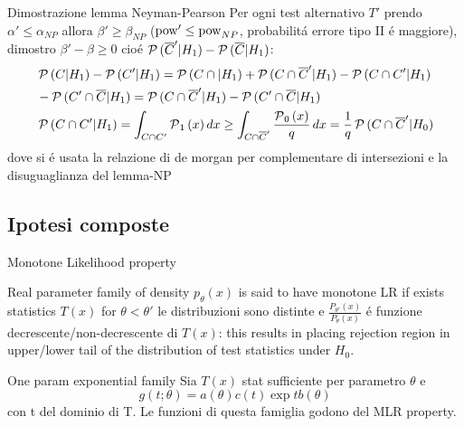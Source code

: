 \begin{wordonframe}{Dimostrazione lemma Neyman-Pearson}
Per ogni test alternativo $T'$ prendo $\alpha'\leq\alpha_{NP}$ allora $\beta'\geq\beta_{NP}$ ($\operatorname{pow}'\leq\operatorname{pow}_{NP}$, probabilit\'a errore tipo II \'e maggiore), dimostro $\beta'-\beta\geq0$ cio\'e $\operatorname{\mathcal{P}}{(\overline{C}'|H_1)}-\operatorname{\mathcal{P}}{(\overline{C}|H_1)}$:
\begin{align*}
&\operatorname{\mathcal{P}}{(C|H_1)}-\operatorname{\mathcal{P}}{(C'|H_1)}=\operatorname{\mathcal{P}}{(C\cap|H_1)}+\operatorname{\mathcal{P}}{(C\cap\overline{C}'|H_1)}-\operatorname{\mathcal{P}}{(C\cap C'|H_1)}\\
&-\operatorname{\mathcal{P}}{(C'\cap\overline{C}|H_1)}=\operatorname{\mathcal{P}}{(C\cap\overline{C}'|H_1)}-\operatorname{\mathcal{P}}{(C'\cap\overline{C}|H_1)}\\
&\operatorname{\mathcal{P}}{(C\cap C'|H_1)}=\int_{C\cap C'}\operatorname{\mathcal{P}}_1{(x)}\,dx\geq\int_{C\cap \overline{C}'}\frac{\operatorname{\mathcal{P}}_0{(x)}}{q}\,dx=\frac{1}{q}\operatorname{\mathcal{P}}{(C\cap\overline{C}'|H_0)}
\end{align*}
dove si \'e usata la relazione di de morgan per complementare di intersezioni e la disuguaglianza del lemma-NP
\end{wordonframe}

\subsection{Ipotesi composte}

\begin{frame}{Monotone Likelihood property}
\begin{block}{}
Real parameter family of density $p_{\theta}(x)$ is said to have monotone LR if exists statistics $T(x)$ for $\theta<\theta'$ le distribuzioni sono distinte e $\frac{P_{\theta'}(x)}{P_{\theta}(x)}$ \'e funzione decrescente/non-decrescente di $T(x)$: this results in placing rejection region in upper/lower tail of the distribution of test statistics under $H_0$.
\end{block}
\begin{block}{One param exponential family}
Sia $T(x)$ stat sufficiente per parametro $\theta$ e 
\begin{equation*}
g(t;\theta)=a(\theta)c(t)\exp{tb(\theta)}
\end{equation*}
con t del dominio di T. Le funzioni di questa famiglia godono del MLR property.
\end{block}
\end{frame}

